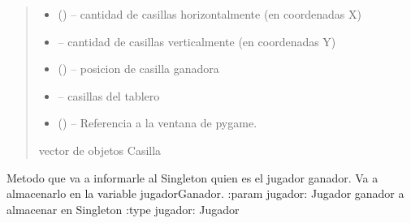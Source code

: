 \documentclass[letterpaper,10pt,english]{sphinxmanual}
\begin{document}
\begin{fulllineitems}
\begin{fulllineitems}
\begin{quote}
\begin{description}
\begin{itemize}
\item {} 
 () -- cantidad de casillas horizontalmente (en coordenadas X)

\item {} 
 -- cantidad de casillas verticalmente (en coordenadas Y)

\item {} 
 () -- posicion de casilla ganadora

\item {} 
 -- casillas del tablero

\item {} 
 () -- Referencia a la ventana de pygame.

\end{itemize}

\item[{Type}] \leavevmode
vector de objetos Casilla

\end{description}\end{quote}

\end{fulllineitems}


\begin{fulllineitems}
\label{\detokenize{codigo:singleton.Singleton.setJugadorGanador}}
Metodo que va a informarle al Singleton quien es el jugador ganador. Va a almacenarlo en la variable
jugadorGanador.
:param jugador: Jugador ganador a almacenar en Singleton
:type jugador: Jugador

\end{fulllineitems}



\end{fulllineitems}
\end{document}
